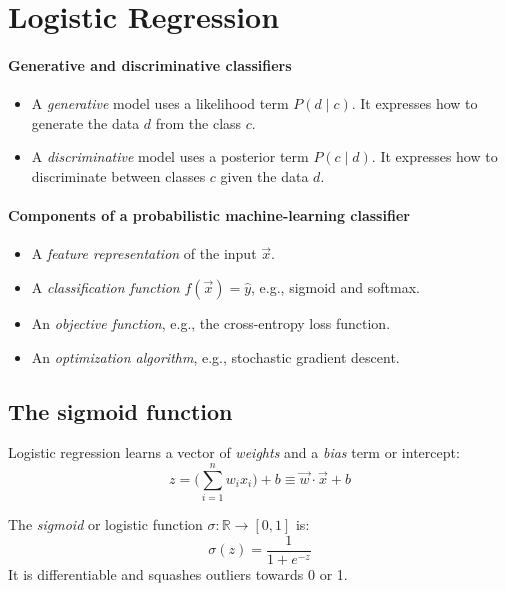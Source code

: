 \section{Logistic Regression}

\paragraph{Generative and discriminative classifiers}

\begin{itemize}
  \item A \textit{generative} model uses a likelihood term $P(d \mid c)$.
        It expresses how to generate the data $d$ from the class $c$.
  \item A \textit{discriminative} model uses a posterior term $P(c \mid d)$.
        It expresses how to discriminate between classes $c$ given the data $d$.
\end{itemize}

\paragraph{Components of a probabilistic machine-learning classifier}

\begin{itemize}
  \item A \textit{feature representation} of the input $\vec{x}$.
  \item A \textit{classification function} $f(\vec{x}) = \hat{y}$, e.g., sigmoid and softmax.
  \item An \textit{objective function}, e.g., the cross-entropy loss function.
  \item An \textit{optimization algorithm}, e.g., stochastic gradient descent.
\end{itemize}

\subsection{The sigmoid function}

Logistic regression learns a vector of \textit{weights} and a \textit{bias} term or intercept:
\begin{equation}
  \label{eqnClassification}
  z = \biggl( \sum_{i = 1}^{n} w_i x_i \biggr) + b \equiv \vec{w} \cdot \vec{x} + b
\end{equation}

The \textit{sigmoid} or logistic function $\sigma : \mathbb{R} \rightarrow [0, 1]$ is:
\begin{equation}
  \label{eqnSigmoid}
  \sigma(z) = \frac{1}{1 + e^{-z}}
\end{equation}
It is differentiable and squashes outliers towards 0 or 1.

